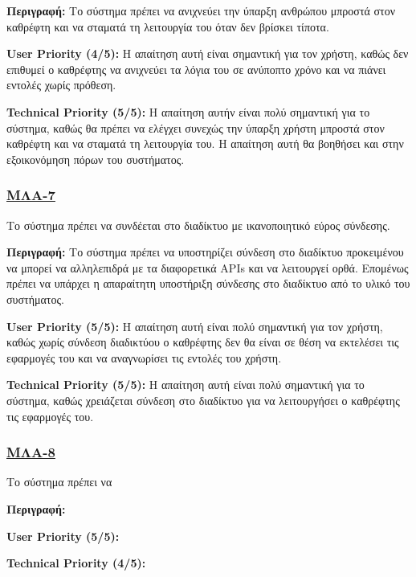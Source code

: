\noindent\textbf{Περιγραφή:} Το σύστημα πρέπει να ανιχνεύει την ύπαρξη ανθρώπου μπροστά στον καθρέφτη και να σταματά τη λειτουργία του όταν δεν βρίσκει τίποτα.

\noindent\textbf{User Priority (4/5):} Η απαίτηση αυτή είναι σημαντική για τον χρήστη, καθώς δεν επιθυμεί ο καθρέφτης να ανιχνεύει τα λόγια του σε ανύποπτο χρόνο και να πιάνει εντολές χωρίς πρόθεση.

\noindent\textbf{Technical Priority (5/5):} Η απαίτηση αυτήν είναι πολύ σημαντική για το σύστημα, καθώς θα πρέπει να ελέγχει συνεχώς την ύπαρξη χρήστη μπροστά στον καθρέφτη και να σταματά τη λειτουργία του. Η απαίτηση αυτή θα βοηθήσει και στην εξοικονόμηση πόρων του συστήματος.

\subsubsection{\underline{ΜΛΑ-7}}
\noindent Το σύστημα πρέπει να συνδέεται στο διαδίκτυο με ικανοποιητικό εύρος σύνδεσης.

\noindent\textbf{Περιγραφή:} Το σύστημα πρέπει να υποστηρίζει σύνδεση στο διαδίκτυο προκειμένου να μπορεί να αλληλεπιδρά με τα διαφορετικά APIs και να λειτουργεί ορθά. Επομένως πρέπει να υπάρχει η απαραίτητη υποστήριξη σύνδεσης στο διαδίκτυο από το υλικό του συστήματος.

\noindent\textbf{User Priority (5/5):} Η απαίτηση αυτή είναι πολύ σημαντική για τον χρήστη, καθώς χωρίς σύνδεση διαδικτύου ο καθρέφτης δεν θα είναι σε θέση να εκτελέσει τις εφαρμογές του και να αναγνωρίσει τις εντολές του χρήστη.

\noindent\textbf{Technical Priority (5/5):} Η απαίτηση αυτή είναι πολύ σημαντική για το σύστημα, καθώς χρειάζεται σύνδεση στο διαδίκτυο για να λειτουργήσει ο καθρέφτης τις εφαρμογές του. 

\subsubsection{\underline{ΜΛΑ-8}}
\noindent Το σύστημα πρέπει να 

\noindent\textbf{Περιγραφή:}

\noindent\textbf{User Priority (5/5):}

\noindent\textbf{Technical Priority (4/5):}